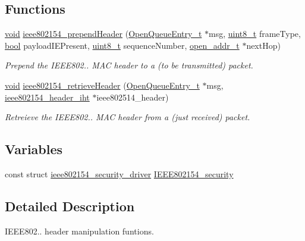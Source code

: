 \subsection*{Functions}
\begin{DoxyCompactItemize}
\item 
\hyperlink{usb__devapi_8h_afabf60e7f57651d6d595a02c75f07cd0}{void} \hyperlink{group___i_e_e_e802154_ga40f9a62b9a5a5f68a2864e85dfa4eb65}{ieee802154\+\_\+prepend\+Header} (\hyperlink{struct_open_queue_entry__t}{Open\+Queue\+Entry\+\_\+t} $\ast$msg, \hyperlink{_p_e___types_8h_aba7bc1797add20fe3efdf37ced1182c5}{uint8\+\_\+t} frame\+Type, \hyperlink{_p_e___types_8h_a97a80ca1602ebf2303258971a2c938e2}{bool} payload\+I\+E\+Present, \hyperlink{_p_e___types_8h_aba7bc1797add20fe3efdf37ced1182c5}{uint8\+\_\+t} sequence\+Number, \hyperlink{structopen__addr__t}{open\+\_\+addr\+\_\+t} $\ast$next\+Hop)
\begin{DoxyCompactList}\small\item\em Prepend the I\+E\+E\+E802.. M\+AC header to a (to be transmitted) packet. \end{DoxyCompactList}\item 
\hyperlink{usb__devapi_8h_afabf60e7f57651d6d595a02c75f07cd0}{void} \hyperlink{group___i_e_e_e802154_ga62ad52a66f77e01d00e3e69c33abf53c}{ieee802154\+\_\+retrieve\+Header} (\hyperlink{struct_open_queue_entry__t}{Open\+Queue\+Entry\+\_\+t} $\ast$msg, \hyperlink{structieee802154__header__iht}{ieee802154\+\_\+header\+\_\+iht} $\ast$ieee802514\+\_\+header)
\begin{DoxyCompactList}\small\item\em Retreieve the I\+E\+E\+E802.. M\+AC header from a (just received) packet. \end{DoxyCompactList}\end{DoxyCompactItemize}
\subsection*{Variables}
\begin{DoxyCompactItemize}
\item 
const struct \hyperlink{structieee802154__security__driver}{ieee802154\+\_\+security\+\_\+driver} \hyperlink{group___i_e_e_e802154_gaa8b8110923d0b01d2a16234ef052908e}{I\+E\+E\+E802154\+\_\+security}
\end{DoxyCompactItemize}


\subsection{Detailed Description}
I\+E\+E\+E802.. header manipulation funtions. 

